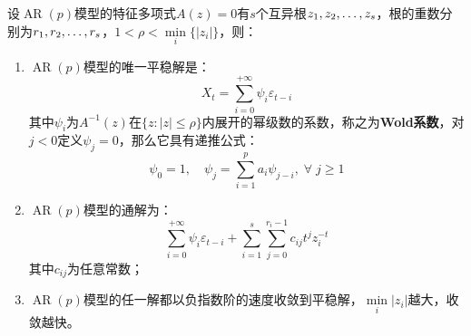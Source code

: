 \begin{theorem}\label{theo:ARPSolution}
	设$\operatorname{AR}(p)$模型的特征多项式$A(z)=0$有$s$个互异根$z_1, z_2, \dots, z_{s}$，根的重数分别为$r_1, r_2, \dots, r_{s}$，$1<\rho<\min\limits_i\{|z_i|\}$，则：
	\begin{enumerate}
		\item $\operatorname{AR}(p)$模型的唯一平稳解是：
		\begin{equation*}
			X_t=\sum_{i=0}^{+\infty}\psi_i\varepsilon_{t-i}
		\end{equation*}
		其中$\psi_i$为$A^{-1}(z)$在$\{z:|z|\leqslant\rho\}$内展开的幂级数的系数，称之为\textbf{Wold系数}，对$j<0$定义$\psi_j=0$，那么它具有递推公式：
		\begin{equation*}
			\psi_0=1,\quad\psi_j=\sum_{i=1}^{p}a_i\psi_{j-i},\;\forall\;j\geqslant1
		\end{equation*}
		\item $\operatorname{AR}(p)$模型的通解为：
		\begin{equation*}
			\sum_{i=0}^{+\infty}\psi_i\varepsilon_{t-i}+\sum_{i=1}^{s}\sum_{j=0}^{r_i-1}c_{ij}t^{j}z_i^{-t}
		\end{equation*}
		其中$c_{ij}$为任意常数；
		\item $\operatorname{AR}(p)$模型的任一解都以负指数阶的速度收敛到平稳解，$\min\limits_i{|z_i|}$越大，收敛越快。
	\end{enumerate}
\end{theorem}
